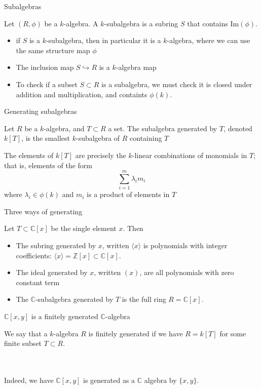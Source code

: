 \documentclass{beamer}
\newcommand{\C}{\mathbb{C}}
\newcommand{\Z}{\mathbb{Z}}
\begin{document}
\begin{frame}{Subalgebras}
\begin{definition} Let $(R,\phi)$ be a $k$-algebra.  A $k$-subalgebra is a subring $S$ that contains $\textrm{Im}(\phi)$.  
\end{definition}

\begin{itemize}
\item if $S$ is a $k$-subalgebra, then in particular it is a $k$-algebra, where we can use the same structure map $\phi$
\item The inclusion map $S\hookrightarrow R$ is a $k$-algebra map
\item To check if a subset $S\subset R$ is a subalgebra, we must check it is closed under addition and multiplication, and containts $\phi(k)$.
\end{itemize}


\end{frame}


\begin{frame}{Generating subalgebras}

\begin{definition} Let $R$ be a $k$-algebra, and $T\subset R$ a set.  The subalgebra generated by $T$, denoted $k[T]$, is the smallest $k$-subalgebra of $R$ containing $T$
\end{definition}

\begin{lemma} The elements of $k[T]$ are precisely the $k$-linear combinations of monomials in $T$; that is, elements of the form
$$\sum_{i=1}^m \lambda_i m_i$$
where $\lambda_i\in \phi(k)$ and $m_i$ is a product of elements in $T$
\end{lemma}
\end{frame}

\begin{frame}{Three ways of generating}

Let $T\subset \C[x]$ be the single element $x$.  Then
\begin{itemize}
\item The subring generated by $x$, written $\langle x\rangle$ is polynomials with integer coefficients: $\langle x\rangle=\Z[x]\subset \C[x]$.
\item The ideal generated by $x$, written $(x)$, are all polynomials with zero constant term
\item The $\C$-subalgebra generated by $T$ is the full ring $R=\C[x]$.
\end{itemize}
\end{frame}

\begin{frame}{$\C[x,y]$ is a finitely generated $\C$-algebra}
\begin{definition}
We say that a $k$-algebra $R$ is finitely generated if we have $R=k[T]$ for some finite subset $T\subset R$.
\end{definition}
\\~\\
Indeed, we have $\C[x,y]$ is generated as a $\C$ algebra by $\{x,y\}$.
\end{frame}
\end{document}
